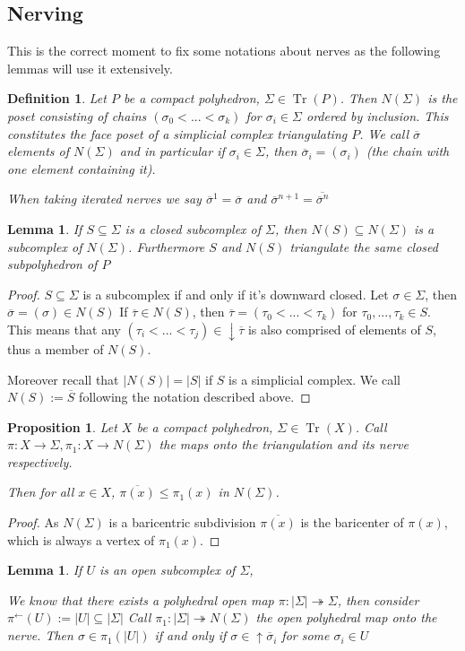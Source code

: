 \documentclass[12pt]{article}
\DeclareMathOperator{\Tr}{Tr}
\newtheorem{definition}[theorem]{Definition}
\newtheorem{proposition}[theorem]{Proposition}
\newtheorem{lemma}[theorem]{Lemma}
\numberwithin{equation}{subsection}
\begin{document}
\subsection{Nerving}
This is the correct moment to fix some notations about nerves as the following lemmas will use it extensively.
\begin{definition}
	Let $P$ be a compact polyhedron, $\Sigma\in \Tr(P)$.
	Then $N(\Sigma)$ is the poset consisting of chains $(\sigma_0<...<\sigma_k)$ for $\sigma_i\in\Sigma$ ordered by inclusion.
	This constitutes the face poset of a simplicial complex triangulating $P$.
	We call $\overline{\sigma}$ elements of $N(\Sigma)$ and in particular if $\sigma_i\in \Sigma$, then $\overline\sigma_i=(\sigma_i)$ (the chain with one element containing it).
	
	When taking iterated nerves we say $\overline{\sigma}^1=\overline\sigma$ and  $\overline\sigma^{n+1}=\overline{\overline\sigma^n}$
\end{definition}
\begin{lemma}
	If $S\subseteq \Sigma$ is a closed subcomplex of $\Sigma$, then $N(S)\subseteq N(\Sigma)$ is a subcomplex of $N(\Sigma)$.
	Furthermore $S$ and $N(S)$ triangulate the same closed subpolyhedron of $P$
\end{lemma}
\begin{proof}
$S\subseteq \Sigma$ is a subcomplex if and only if it's downward closed. Let $\sigma\in \Sigma$, then $\overline\sigma=(\sigma)\in N(S)$
	If $\overline\tau\in N(S)$, then $\overline\tau=(\tau_0<...<\tau_k)$ for $\tau_0,...,\tau_k\in S$.
	This means that any $(\tau_i<...<\tau_j)\in \downarrow \overline\tau$ is also comprised of elements of $S$, thus a member of $N(S)$.
	
	Moreover recall that $|N(S)|=|S|$ if $S$ is a simplicial complex. 
	We call $N(S):=\overline S$ following the notation described above.
\end{proof}
\begin{proposition}
	Let $X$ be a compact polyhedron, $\Sigma\in \Tr(X)$.
	Call $\pi:X\to \Sigma,\pi_1:X\to N(\Sigma)$ the maps onto the triangulation and its nerve respectively.
	
	Then for all $x\in X$, $\overline{\pi(x)}\leq \pi_1(x)$ in $N(\Sigma)$.
\end{proposition}
\begin{proof}
	As $N(\Sigma)$ is a baricentric subdivision $\overline{\pi(x)}$ is the baricenter of $\pi(x)$, which is always a vertex of $\pi_1(x).$
\end{proof}
\begin{lemma}
If $U$ is an open subcomplex of $\Sigma$,

We know that there exists a polyhedral open map $\pi:|\Sigma|\twoheadrightarrow\Sigma$, then consider $\pi^{\gets}(U):=|U|\subseteq |\Sigma|$	
Call $\pi_1:|\Sigma|\twoheadrightarrow N(\Sigma)$ the open polyhedral map onto the nerve.
Then $\sigma\in \pi_1(|U|)$ if and only if $\sigma\in \uparrow\overline\sigma_i$ for some $\sigma_i\in U$
\end{lemma}
\end{document}
